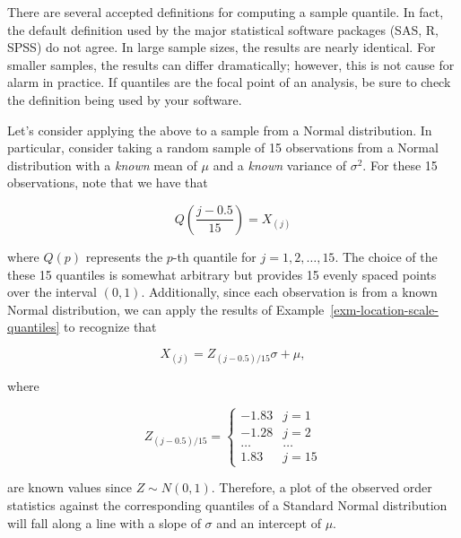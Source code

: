 \documentclass[
  letterpaper,
  DIV=11,
  numbers=noendperiod]{scrreprt}
\theoremstyle{definition}
\theoremstyle{plain}
\theoremstyle{definition}
\theoremstyle{remark}
\begin{document}
\begin{tcolorbox}[enhanced jigsaw, breakable, colframe=quarto-callout-note-color-frame, titlerule=0mm, arc=.35mm, coltitle=black, opacitybacktitle=0.6, leftrule=.75mm, opacityback=0, left=2mm, toprule=.15mm, colbacktitle=quarto-callout-note-color!10!white, title=\textcolor{quarto-callout-note-color}{\faInfo}\hspace{0.5em}{Note}, bottomtitle=1mm, toptitle=1mm, rightrule=.15mm, bottomrule=.15mm, colback=white]

There are several accepted definitions for computing a sample quantile.
In fact, the default definition used by the major statistical software
packages (SAS, R, SPSS) do not agree. In large sample sizes, the results
are nearly identical. For smaller samples, the results can differ
dramatically; however, this is not cause for alarm in practice. If
quantiles are the focal point of an analysis, be sure to check the
definition being used by your software.

\end{tcolorbox}

Let's consider applying the above to a sample from a Normal
distribution. In particular, consider taking a random sample of 15
observations from a Normal distribution with a \emph{known} mean of
\(\mu\) and a \emph{known} variance of \(\sigma^2\). For these 15
observations, note that we have that

\[Q\left(\frac{j - 0.5}{15}\right) = X_{(j)}\]

where \(Q(p)\) represents the \(p\)-th quantile for
\(j = 1,2,\dotsc, 15\). The choice of the these 15 quantiles is somewhat
arbitrary but provides 15 evenly spaced points over the interval
\((0, 1)\). Additionally, since each observation is from a known Normal
distribution, we can apply the results of
Example~\ref{exm-location-scale-quantiles} to recognize that

\[X_{(j)} = Z_{(j - 0.5)/15} \sigma + \mu,\]

where

\[Z_{(j - 0.5)/15} = \begin{cases} -1.83 & j = 1 \\ -1.28 & j = 2 \\ \dotsc & \dotsc \\ 1.83 & j = 15\end{cases}\]

are known values since \(Z \sim N(0, 1)\). Therefore, a plot of the
observed order statistics against the corresponding quantiles of a
Standard Normal distribution will fall along a line with a slope of
\(\sigma\) and an intercept of \(\mu\).
\end{document}
